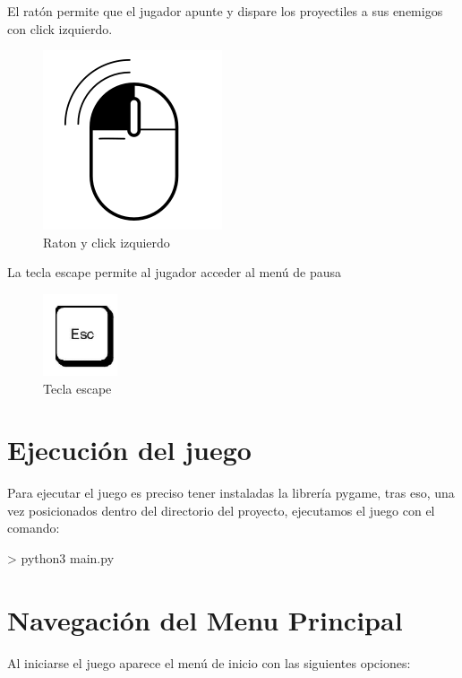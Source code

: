 El ratón permite que el jugador apunte y dispare los proyectiles a sus enemigos con click izquierdo.

\begin{figure}[H]
	\centering
	\includegraphics[scale=0.50]{imagenes/raton.png}
	\caption{\label{fig:raton}Raton y click izquierdo}
\end{figure}

La tecla escape permite al jugador acceder al menú de pausa
\begin{figure}[H]
	\centering
	\includegraphics[scale=0.50]{imagenes/escape.png}
	\caption{\label{fig:escape}Tecla escape}
\end{figure}

\section{Ejecución del juego}
Para ejecutar el juego es preciso tener instaladas la librería pygame, tras eso, una vez posicionados dentro del directorio del proyecto, ejecutamos el juego con el comando: 

> python3 main.py 

\section{Navegación del Menu Principal}
Al iniciarse el juego aparece el menú de inicio con las siguientes opciones: 

